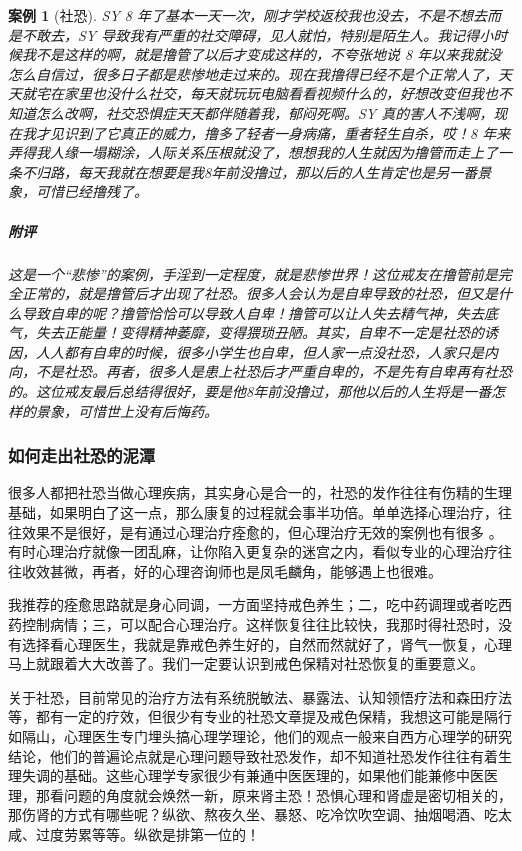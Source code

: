 \documentclass{ctexart}
\newtheorem{case}{案例}
\begin{document}
\begin{case}[社恐]
    SY 8 年了基本一天一次，刚才学校返校我也没去，不是不想去而是不敢去，SY 导致我有严重的社交障碍，见人就怕，特别是陌生人。我记得小时候我不是这样的啊，就是撸管了以后才变成这样的，不夸张地说 8 年以来我就没怎么自信过，很多日子都是悲惨地走过来的。现在我撸得已经不是个正常人了，天天就宅在家里也没什么社交，每天就玩玩电脑看看视频什么的，好想改变但我也不知道怎么改啊，社交恐惧症天天都伴随着我，郁闷死啊。SY 真的害人不浅啊，现在我才见识到了它真正的威力，撸多了轻者一身病痛，重者轻生自杀，哎！8 年来弄得我人缘一塌糊涂，人际关系压根就没了，想想我的人生就因为撸管而走上了一条不归路，每天我就在想要是我8年前没撸过，那以后的人生肯定也是另一番景象，可惜已经撸残了。
    \subparagraph{附评} 这是一个“悲惨”的案例，手淫到一定程度，就是悲惨世界！这位戒友在撸管前是完全正常的，就是撸管后才出现了社恐。很多人会认为是自卑导致的社恐，但又是什么导致自卑的呢？撸管恰恰可以导致人自卑！撸管可以让人失去精气神，失去底气，失去正能量！变得精神萎靡，变得猥琐丑陋。其实，自卑不一定是社恐的诱因，人人都有自卑的时候，很多小学生也自卑，但人家一点没社恐，人家只是内向，不是社恐。再者，很多人是患上社恐后才严重自卑的，不是先有自卑再有社恐的。这位戒友最后总结得很好，要是他8年前没撸过，那他以后的人生将是一番怎样的景象，可惜世上没有后悔药。
\end{case}

\subsubsection{如何走出社恐的泥潭}

很多人都把社恐当做心理疾病，其实身心是合一的，社恐的发作往往有伤精的生理基础，如果明白了这一点，那么康复的过程就会事半功倍。单单选择心理治疗，往往效果不是很好，是有通过心理治疗痊愈的，但心理治疗无效的案例也有很多 。有时心理治疗就像一团乱麻，让你陷入更复杂的迷宫之内，看似专业的心理治疗往往收效甚微，再者，好的心理咨询师也是凤毛麟角，能够遇上也很难。

我推荐的痊愈思路就是身心同调，一方面坚持戒色养生；二，吃中药调理或者吃西药控制病情；三，可以配合心理治疗。这样恢复往往比较快，我那时得社恐时，没有选择看心理医生，我就是靠戒色养生好的，自然而然就好了，肾气一恢复，心理马上就跟着大大改善了。我们一定要认识到戒色保精对社恐恢复的重要意义。

关于社恐，目前常见的治疗方法有系统脱敏法、暴露法、认知领悟疗法和森田疗法等，都有一定的疗效，但很少有专业的社恐文章提及戒色保精，我想这可能是隔行如隔山，心理医生专门埋头搞心理学理论，他们的观点一般来自西方心理学的研究结论，他们的普遍论点就是心理问题导致社恐发作，却不知道社恐发作往往有着生理失调的基础。这些心理学专家很少有兼通中医医理的，如果他们能兼修中医医理，那看问题的角度就会焕然一新，原来肾主恐！恐惧心理和肾虚是密切相关的，那伤肾的方式有哪些呢？纵欲、熬夜久坐、暴怒、吃冷饮吹空调、抽烟喝酒、吃太咸、过度劳累等等。纵欲是排第一位的！
\end{document}
